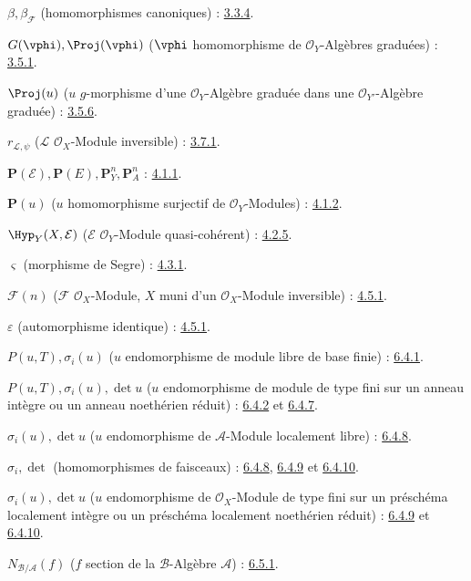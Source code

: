 $\beta,\beta_{\mathcal{F}}$ (homomorphismes canoniques) : \hyperref[II.3.3.4-fr]{3.3.4}.

$G(\vphi),\Proj(\vphi)$
($\vphi$ homomorphisme de $\mathcal{O}_Y$-Algèbres graduées) : \hyperref[II.3.5.1-fr]{3.5.1}.

$\Proj(u)$ ($u$ $g$-morphisme d'une $\mathcal{O}_Y$-Algèbre graduée
dans une $\mathcal{O}_{Y'}$-Algèbre graduée) : \hyperref[II.3.5.6-fr]{3.5.6}.

$r_{\mathcal{L},\psi}$ ($\mathcal{L}$ $\mathcal{O}_X$-Module inversible) : \hyperref[II.3.7.1-fr]{3.7.1}.

$\mathbf{P}(\mathcal{E}),\mathbf{P}(E),\mathbf{P}_Y^n,\mathbf{P}_A^n$ : \hyperref[II.4.1.1-fr]{4.1.1}.

$\mathbf{P}(u)$ ($u$ homomorphisme surjectif de $\mathcal{O}_Y$-Modules) : \hyperref[II.4.1.2-fr]{4.1.2}.

$\Hyp_Y(X,\mathcal{E})$ ($\mathcal{E}$ $\mathcal{O}_Y$-Module quasi-cohérent) : \hyperref[II.4.2.5-fr]{4.2.5}.

$\varsigma$ (morphisme de Segre) : \hyperref[II.4.3.1-fr]{4.3.1}.

$\mathcal{F}(n)$ ($\mathcal{F}$ $\mathcal{O}_X$-Module, $X$ muni d'un
$\mathcal{O}_X$-Module inversible) : \hyperref[II.4.5.1-fr]{4.5.1}.

$\varepsilon$ (automorphisme identique) : \hyperref[II.4.5.1-fr]{4.5.1}.

$P(u,T),\sigma_i(u)$ ($u$ endomorphisme de module libre de base finie) : \hyperref[II.6.4.1-fr]{6.4.1}.

$P(u,T),\sigma_i(u),\det u$
($u$ endomorphisme de module de type fini sur un anneau intègre ou un
anneau noethérien réduit) : \hyperref[II.6.4.2-fr]{6.4.2} et \hyperref[II.6.4.7-fr]{6.4.7}.

$\sigma_i(u),\det u$ ($u$ endomorphisme de $\mathcal{A}$-Module localement libre) : \hyperref[II.6.4.8-fr]{6.4.8}.

$\sigma_i,\det$ (homomorphismes de faisceaux) : \hyperref[II.6.4.8-fr]{6.4.8}, \hyperref[II.6.4.9-fr]{6.4.9} et \hyperref[II.6.4.10-fr]{6.4.10}.

$\sigma_i(u),\det u$
($u$ endomorphisme de $\mathcal{O}_X$-Module de type fini sur un préschéma
localement intègre ou un préschéma localement noethérien réduit) :
\hyperref[II.6.4.9-fr]{6.4.9} et \hyperref[II.6.4.10-fr]{6.4.10}.

$N_{\mathcal{B}/\mathcal{A}}(f)$
($f$ section de la $\mathcal{B}$-Algèbre $\mathcal{A}$) : \hyperref[II.6.5.1-fr]{6.5.1}.

